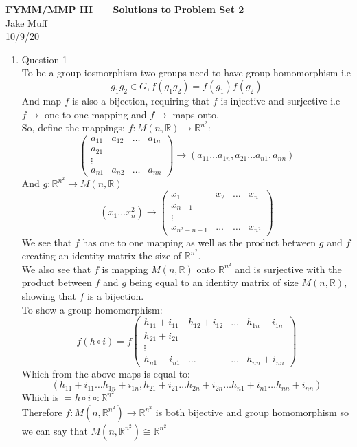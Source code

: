 \documentclass[12pt]{article}
\begin{document}
\normalsize

\baselineskip 14pt

\begin{center}
{\Large {\bf FYMM/MMP III \ \ \   Solutions to Problem Set 2}}
\\
{\large{Jake Muff}}
\\
10/9/20
\end{center}


\begin{enumerate}
\item Question 1
\\ 
To be a group iosmorphism two groups need to have group homomorphism i.e 
$$ g_1 g_2 \in G, f(g_1 g_2) =f(g_1)f(g_2) $$
And map $f$ is also a bijection, requiring that $f$ is injective and surjective i.e $f \rightarrow$ one to one mapping and $f \rightarrow $ maps onto. 
\\ So, define the mappings: $f:M(n,\mathbb{R}) \rightarrow \mathbb{R}^{n^2}$:
$$ \left( \begin{array}{cccc} a_{11} & a_{12} & \ldots & a_{1n} \\ a_{21} &  & & \\ \vdots &  & & \\ a_{n1} & a_{n2} & \ldots & a_{nn} \end{array}\right) \rightarrow (a_{11} \ldots a_{1n}, a_{21} \ldots a_{n1}, a_{nn})$$
And $g: \mathbb{R}^{n^2} \rightarrow M(n,\mathbb{R})$
$$ (x_1 \ldots x_n^2) \rightarrow \left( \begin{array}{cccc} x_{1} & x_{2} & \ldots & x_{n} \\ x_{n+1} &  & & \\ \vdots &  & & \\ x_{n^2-n+1} & \ldots & \ldots & x_{n^2} \end{array}\right) $$
We see that $f$ has one to one mapping as well as the product between $g$ and $f$ creating an identity matrix the size of $\mathbb{R}^{n^2}$. 
\\
We also see that $f$ is mapping $M(n,\mathbb{R})$ onto $\mathbb{R}^{n^2}$ and is surjective with the product between $f$ and $g$ being equal to an identity matrix of size $M(n,\mathbb{R})$, showing that $f$ is a bijection. 
\\ 
To show a group homomorphism:
$$ f(h \circ i) = f\left( \begin{array}{cccc} h_{11}+i_{11} & h_{12}+i_{12} & \ldots & h_{1n}+i_{1n} \\ h_{21}+i_{21} &  & & \\ \vdots &  & & \\ h_{n1}+i_{n1} & \ldots & \ldots & h_{nn}+i_{nn} \end{array}\right) $$
Which from the above maps is equal to: 
$$ (h_{11}+i_{11} \ldots h_{1n}+i_{1n}, h_{21}+i_{21} \ldots h_{2n}+i_{2n} \ldots h_{n1}+i_{n1} \ldots h_{nn}+i_{nn}) $$
Which is $ = h \circ i \ \circ : \mathbb{R}^{n^2} $
\\ 
Therefore $f:M(n,\mathbb{R}^{n^2}) \rightarrow \mathbb{R}^{n^2}$ is both bijective and group homomorphism so we can say that $M(n,\mathbb{R}^{n^2}) \cong \mathbb{R}^{n^2} $



\end{enumerate}
\end{document}
